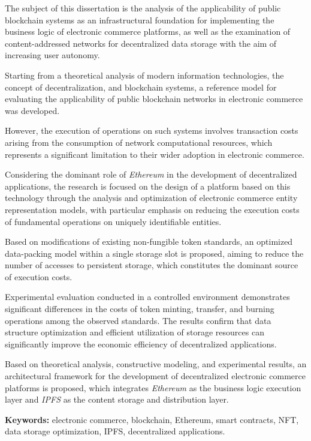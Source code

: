 The subject of this dissertation is the analysis of the applicability of public blockchain systems as an infrastructural foundation for implementing the business logic of electronic commerce platforms, as well as the examination of content-addressed networks for decentralized data storage with the aim of increasing user autonomy.

Starting from a theoretical analysis of modern information technologies, the concept of decentralization, and blockchain systems, a reference model for evaluating the applicability of public blockchain networks in electronic commerce was developed.

However, the execution of operations on such systems involves transaction costs arising from the consumption of network computational resources, which represents a significant limitation to their wider adoption in electronic commerce.

Considering the dominant role of \textit{Ethereum} in the development of decentralized applications, the research is focused on the design of a platform based on this technology through the analysis and optimization of electronic commerce entity representation models, with particular emphasis on reducing the execution costs of fundamental operations on uniquely identifiable entities.

Based on modifications of existing non-fungible token standards, an optimized data-packing model within a single storage slot is proposed, aiming to reduce the number of accesses to persistent storage, which constitutes the dominant source of execution costs.

Experimental evaluation conducted in a controlled environment demonstrates significant differences in the costs of token minting, transfer, and burning operations among the observed standards. The results confirm that data structure optimization and efficient utilization of storage resources can significantly improve the economic efficiency of decentralized applications.

Based on theoretical analysis, constructive modeling, and experimental results, an architectural framework for the development of decentralized electronic commerce platforms is proposed, which integrates \textit{Ethereum} as the business logic execution layer and \textit{IPFS} as the content storage and distribution layer.

\vspace{0.5em}

\textbf{Keywords:} electronic commerce, blockchain, Ethereum, smart contracts, NFT, data storage optimization, IPFS, decentralized applications.

\tableofcontents
\hypersetup{pageanchor=true}